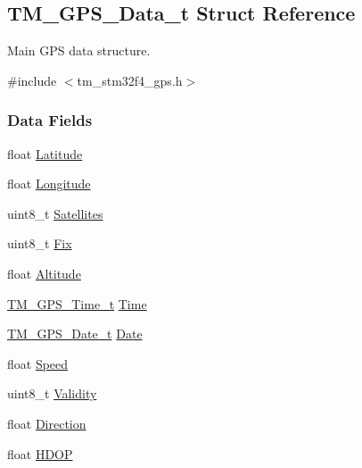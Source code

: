 \hypertarget{struct_t_m___g_p_s___data__t}{}\subsection{T\+M\+\_\+\+G\+P\+S\+\_\+\+Data\+\_\+t Struct Reference}
\label{struct_t_m___g_p_s___data__t}


Main G\+P\+S data structure.  




{\ttfamily \#include $<$tm\+\_\+stm32f4\+\_\+gps.\+h$>$}

\subsubsection*{Data Fields}
\begin{DoxyCompactItemize}
\item 
float \hyperlink{struct_t_m___g_p_s___data__t_a81398e75d8a39d3b3ef55b4da09fcfe3}{Latitude}
\item 
float \hyperlink{struct_t_m___g_p_s___data__t_a2e2415e2fa561522c450fab2302b2e98}{Longitude}
\item 
uint8\+\_\+t \hyperlink{struct_t_m___g_p_s___data__t_a0f88ecbf6fdf3e37c7f68680f6f88a40}{Satellites}
\item 
uint8\+\_\+t \hyperlink{struct_t_m___g_p_s___data__t_a515ce3d2bd3474446275a430a2f652c3}{Fix}
\item 
float \hyperlink{struct_t_m___g_p_s___data__t_acc81deedbd68806fa549c2b92a3d21e0}{Altitude}
\item 
\hyperlink{struct_t_m___g_p_s___time__t}{T\+M\+\_\+\+G\+P\+S\+\_\+\+Time\+\_\+t} \hyperlink{struct_t_m___g_p_s___data__t_a57a7872a3ef75ec2fdb0178b6250ccfc}{Time}
\item 
\hyperlink{struct_t_m___g_p_s___date__t}{T\+M\+\_\+\+G\+P\+S\+\_\+\+Date\+\_\+t} \hyperlink{struct_t_m___g_p_s___data__t_a2835529eed7641976b4df1b460174b14}{Date}
\item 
float \hyperlink{struct_t_m___g_p_s___data__t_a61efabcca15cccefe7d85ea6da6af5e3}{Speed}
\item 
uint8\+\_\+t \hyperlink{struct_t_m___g_p_s___data__t_a5ef71b2bdce07e7189b2ab1c05773f66}{Validity}
\item 
float \hyperlink{struct_t_m___g_p_s___data__t_ae2fdd834ad7e266ee87728da45d6da23}{Direction}
\item 
float \hyperlink{struct_t_m___g_p_s___data__t_ab9956f8a7c5930b1a64d60b162559a28}{H\+D\+O\+P}
\item 

\end{DoxyCompactItemize}
